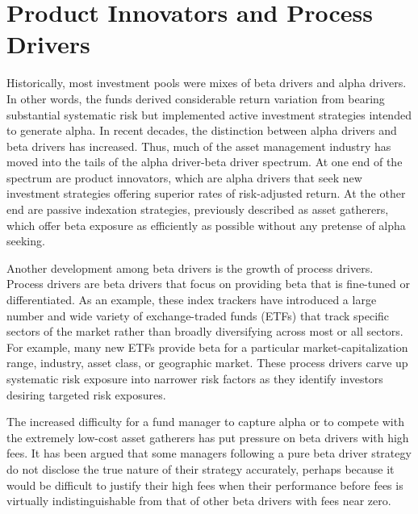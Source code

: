 \documentclass[11pt]{article}
\begin{document}
\section*{Product Innovators and Process Drivers}
Historically, most investment pools were mixes of beta drivers and alpha drivers. In other words, the funds derived considerable return variation from bearing substantial systematic risk but implemented active investment strategies intended to generate alpha. In recent decades, the distinction between alpha drivers and beta drivers has increased. Thus, much of the asset management industry has moved into the tails of the alpha driver-beta driver spectrum. At one end of the spectrum are product innovators, which are alpha drivers that seek new investment strategies offering superior rates of risk-adjusted return. At the other end are passive indexation strategies, previously described as asset gatherers, which offer beta exposure as efficiently as possible without any pretense of alpha seeking.

Another development among beta drivers is the growth of process drivers. Process drivers are beta drivers that focus on providing beta that is fine-tuned or differentiated. As an example, these index trackers have introduced a large number and wide variety of exchange-traded funds (ETFs) that track specific sectors of the market rather than broadly diversifying across most or all sectors. For example, many new ETFs provide beta for a particular market-capitalization range, industry, asset class, or geographic market. These process drivers carve up systematic risk exposure into narrower risk factors as they identify investors desiring targeted risk exposures.

The increased difficulty for a fund manager to capture alpha or to compete with the extremely low-cost asset gatherers has put pressure on beta drivers with high fees. It has been argued that some managers following a pure beta driver strategy do not disclose the true nature of their strategy accurately, perhaps because it\\
would be difficult to justify their high fees when their performance before fees is virtually indistinguishable from that of other beta drivers with fees near zero.
\end{document}
